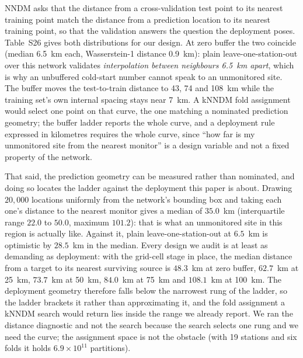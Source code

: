\documentclass[11pt]{article}
\begin{document}
NNDM asks that the distance from a cross-validation test point to its nearest training
point match the distance from a prediction location to its nearest training point, so that
the validation answers the question the deployment poses. Table~S26 gives both
distributions for our design. At zero buffer the two coincide (median 6.5~km each,
Wasserstein-1 distance 0.9~km): plain leave-one-station-out over this network validates
\emph{interpolation between neighbours 6.5~km apart}, which is why an unbuffered cold-start
number cannot speak to an unmonitored site. The buffer moves the test-to-train distance to
43, 74 and 108~km while the training set's own internal spacing stays near 7~km. A kNNDM
fold assignment would select one point on that curve, the one matching a nominated
prediction geometry; the buffer ladder reports the whole curve, and a deployment
rule expressed in kilometres requires the whole curve, since ``how far is my unmonitored site from the
nearest monitor'' is a design variable and not a fixed property of the network.

That said, the prediction geometry can be measured rather than nominated, and doing so
locates the ladder against the deployment this paper is about. Drawing $20{,}000$ locations
uniformly from the network's bounding box and taking each one's distance to the nearest
monitor gives a median of $35.0$~km (interquartile range $22.0$ to $50.0$, maximum
$101.2$): that is what an unmonitored site in this region is actually like. Against it,
plain leave-one-station-out at $6.5$~km is optimistic by $28.5$~km in the median. Every
design we audit is at least as demanding as deployment: with the grid-cell stage in place,
the median distance from a target to its nearest surviving source is $48.3$~km at zero
buffer, $62.7$~km at 25~km, $73.7$~km at 50~km, $84.0$~km at 75~km and $108.1$~km at
100~km. The deployment geometry therefore falls below the narrowest rung of the ladder,
so the ladder brackets it rather than approximating it, and the fold assignment a kNNDM
search would return lies inside the range we already report. We ran the distance
diagnostic and not the search because the search selects one rung and we need the curve;
the assignment space is not the obstacle (with 19 stations and six folds it holds
$6.9\times10^{11}$ partitions).
\end{document}
